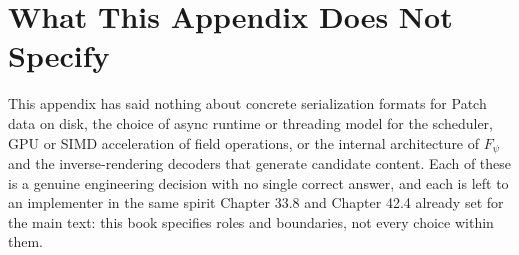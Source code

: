 \section{What This Appendix Does Not Specify}

This appendix has said nothing about concrete serialization formats for Patch data on disk, the choice of async runtime or threading model for the scheduler, GPU or SIMD acceleration of field operations, or the internal architecture of \(F_\psi\) and the inverse-rendering decoders that generate candidate content. Each of these is a genuine engineering decision with no single correct answer, and each is left to an implementer in the same spirit Chapter 33.8 and Chapter 42.4 already set for the main text: this book specifies roles and boundaries, not every choice within them.
